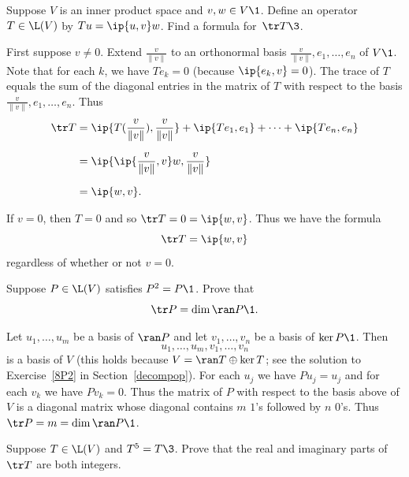 
\exercise
Suppose $V$ is an inner product space and $v, w \in V\1$.  Define an operator
$T \in \L(V)$ by $Tu = \ip{u, v} w$.  Find a formula for~$\tr T\3$.

\begin{Solution}
First suppose $v \ne 0$.  Extend $\frac{v}{\|v\|}$ to an orthonormal basis
$\frac{v}{\|v\|}, e_1, \dots, e_n$ of $V\1$.  Note that for each $k$, we have
$Te_k = 0$ (because $\ip{e_k, v} = 0$).  The trace of $T$ equals
the sum of the diagonal entries in the matrix of $T$ with respect to the basis
$\frac{v}{\|v\|}, e_1, \dots, e_n$.  Thus
\begin{align*}
\tr T &=
\ip{T(\frac{v}{\|v\|}), \frac{v}{\|v\|}} + \ip{Te_1, e_1}
+ \dots + \ip{Te_n, e_n} \\[6bp]
&= \ip{ \ip{\frac{v}{\|v\|}, v}w, \frac{v}{\|v\|}} \\[6bp]
&= \ip{w,v}.
\end{align*}

If $v = 0$, then $T = 0$ and so $\tr T = 0 = \ip{w,v}$.  Thus we have the
formula
\[
\tr T = \ip{w,v}
\]
regardless of whether or not $v = 0$.
\end{Solution}

\exercise
Suppose $P \in \L(V)$ satisfies $P^2 = P\1$. Prove that
\[
\tr P = \dim \ran P\1.
\]
\exercisedisplayend

\begin{Solution}
Let $u_1, \dots, u_m$ be a basis of $\ran P$ and let $v_1, \dots, v_n$ be a basis of $\ker P\1$.  Then
\[
u_1, \dots, u_m, v_1, \dots, v_n
\]
is a basis of $V$ (this holds because
$V = \ran T \oplus \ker T$; see the solution to Exercise~\ref{8P2} in Section~\ref{decompop}).  For
each $u_j$ we have $Pu_j = u_j$ and for each $v_k$ we have $Pv_k = 0$.  Thus the
matrix of $P$ with respect to the basis above of $V$ is a diagonal matrix whose
diagonal contains $m$ $1$'s followed by $n$ $0$'s.  Thus $\tr P = m  = \dim \ran P\1$.
\end{Solution}

\exercise
Suppose $T \in \L(V)$ and $T^5 = T\3$. Prove that the real and imaginary parts of $\tr T$ are both integers.

